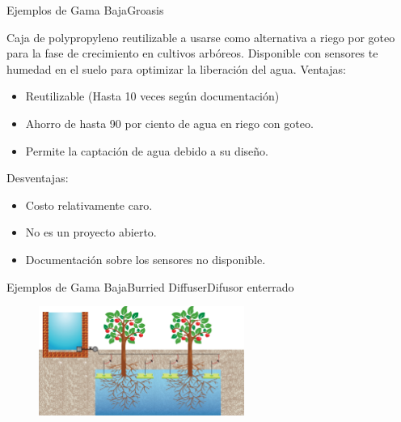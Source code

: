 \documentclass[]{beamer}
\begin{document}
\begin{frame}{Ejemplos de Gama Baja}{Groasis}

Caja de polypropyleno reutilizable a usarse como alternativa a riego por goteo para la fase de crecimiento en cultivos arbóreos. Disponible con sensores te humedad en el suelo para optimizar la liberación del agua.
  Ventajas:
  \begin{itemize}
    \item Reutilizable (Hasta 10 veces según documentación)
    \item Ahorro de hasta 90 por ciento de agua en riego con goteo.
    \item Permite la captación de agua debido a su diseño.
  \end{itemize}

  Desventajas:
  \begin{itemize}
    \item Costo relativamente caro.
    \item No es un proyecto abierto.
    \item Documentación sobre los sensores no disponible.
  \end{itemize}
\end{frame}


\begin{frame}{Ejemplos de Gama Baja}{Burried Diffuser}{Difusor enterrado}
  \begin{figure}
    \includegraphics[width=0.6\textwidth]{Docs/bd1}
  \end{figure}

\end{frame}
\end{document}

